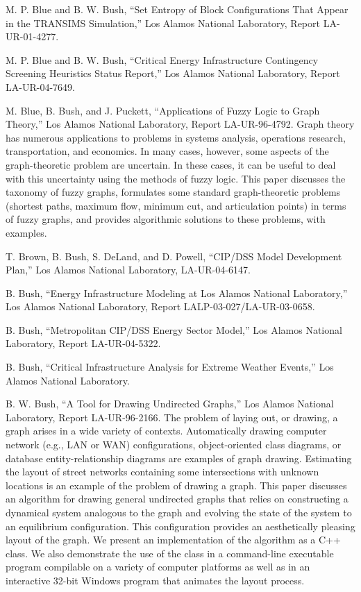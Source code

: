 \documentclass[]{article}
\begin{document}
M. P. Blue and B. W. Bush, ``Set Entropy of Block Configurations That
Appear in the TRANSIMS Simulation,'' Los Alamos National Laboratory,
Report LA-UR-01-4277.

M. P. Blue and B. W. Bush, ``Critical Energy Infrastructure Contingency
Screening Heuristics Status Report,'' Los Alamos National Laboratory,
Report LA-UR-04-7649.

M. Blue, B. Bush, and J. Puckett, ``Applications of Fuzzy Logic to Graph
Theory,'' Los Alamos National Laboratory, Report LA-UR-96-4792. Graph
theory has numerous applications to problems in systems analysis,
operations research, transportation, and economics. In many cases,
however, some aspects of the graph-theoretic problem are uncertain. In
these cases, it can be useful to deal with this uncertainty using the
methods of fuzzy logic. This paper discusses the taxonomy of fuzzy
graphs, formulates some standard graph-theoretic problems (shortest
paths, maximum flow, minimum cut, and articulation points) in terms of
fuzzy graphs, and provides algorithmic solutions to these problems, with
examples.

T. Brown, B. Bush, S. DeLand, and D. Powell, ``CIP/DSS Model Development
Plan,'' Los Alamos National Laboratory, LA-UR-04-6147.

B. Bush, ``Energy Infrastructure Modeling at Los Alamos National
Laboratory,'' Los Alamos National Laboratory, Report
LALP-03-027/LA-UR-03-0658.

B. Bush, ``Metropolitan CIP/DSS Energy Sector Model,'' Los Alamos
National Laboratory, Report LA-UR-04-5322.

B. Bush, ``Critical Infrastructure Analysis for Extreme Weather
Events,'' Los Alamos National Laboratory.

B. W. Bush, ``A Tool for Drawing Undirected Graphs,'' Los Alamos
National Laboratory, Report LA-UR-96-2166. The problem of laying out, or
drawing, a graph arises in a wide variety of contexts. Automatically
drawing computer network (e.g., LAN or WAN) configurations,
object-oriented class diagrams, or database entity-relationship diagrams
are examples of graph drawing. Estimating the layout of street networks
containing some intersections with unknown locations is an example of
the problem of drawing a graph. This paper discusses an algorithm for
drawing general undirected graphs that relies on constructing a
dynamical system analogous to the graph and evolving the state of the
system to an equilibrium configuration. This configuration provides an
aesthetically pleasing layout of the graph. We present an implementation
of the algorithm as a C++ class. We also demonstrate the use of the
class in a command-line executable program compilable on a variety of
computer platforms as well as in an interactive 32-bit Windows program
that animates the layout process.
\end{document}
